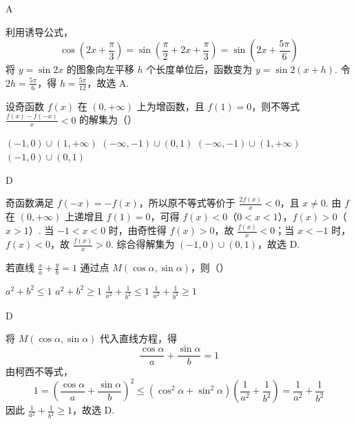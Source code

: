 \begin{answer}
A
\end{answer}

\begin{solution}
利用诱导公式，
\[
\cos\left(2x+\frac{\pi}{3}\right)=\sin\left(\frac{\pi}{2}+2x+\frac{\pi}{3}\right)=\sin\left(2x+\frac{5\pi}{6}\right)
\]
将 \(y=\sin 2x\) 的图象向左平移 \(h\) 个长度单位后，函数变为 \(y=\sin 2(x+h)\). 令 \(2h=\frac{5\pi}{6}\)，得 \(h=\frac{5\pi}{12}\)，故选 A.
\end{solution}

\begin{problem}
设奇函数 \( f(x) \) 在 \((0, +\infty)\) 上为增函数，且 \( f(1) = 0 \)，则不等式 \( \frac{f(x) - f(-x)}{x} < 0 \) 的解集为（\quad）

\choices
    {\((-1,0)\cup (1, + \infty)\)}
    {\((- \infty, -1) \cup (0, 1)\)}
    {\((-\infty, -1) \cup (1, +\infty)\)}
    {\((-1,0)\cup (0,1)\)}
\end{problem}

\begin{answer}
D
\end{answer}

\begin{solution}
奇函数满足 \(f(-x)=-f(x)\)，所以原不等式等价于 \(\frac{2f(x)}{x}<0\)，且 \(x\ne 0\). 由 \(f\) 在 \((0,+\infty)\) 上递增且 \(f(1)=0\)，可得 \(f(x)<0\)（\(0<x<1\)），\(f(x)>0\)（\(x>1\)）. 当 \(-1<x<0\) 时，由奇性得 \(f(x)>0\)，故 \(\frac{f(x)}{x}<0\)；当 \(x<-1\) 时，\(f(x)<0\)，故 \(\frac{f(x)}{x}>0\). 综合得解集为 \((-1,0)\cup(0,1)\)，故选 D.
\end{solution}

\begin{problem}
若直线 \(\frac{x}{a} + \frac{y}{b} = 1\) 通过点 \(M(\cos \alpha, \sin \alpha)\)，则（\quad）

\choices
    {\(a^2 + b^2 \leqslant 1\)}
    {\(a^2 + b^2 \geqslant 1\)}
    {\(\frac{1}{a^2} + \frac{1}{b^2} \leqslant 1\)}
    {\(\frac{1}{a^2} + \frac{1}{b^2} \geqslant 1\)}
\end{problem}

\begin{answer}
D
\end{answer}

\begin{solution}
将 \(M(\cos\alpha,\sin\alpha)\) 代入直线方程，得
\[
\frac{\cos\alpha}{a}+\frac{\sin\alpha}{b}=1
\]
由柯西不等式，
\[
1=\left(\frac{\cos\alpha}{a}+\frac{\sin\alpha}{b}\right)^2
\leqslant(\cos^2\alpha+\sin^2\alpha)\left(\frac{1}{a^2}+\frac{1}{b^2}\right)
=\frac{1}{a^2}+\frac{1}{b^2}
\]
因此 \(\frac{1}{a^2}+\frac{1}{b^2}\geqslant 1\)，故选 D.
\end{solution}

